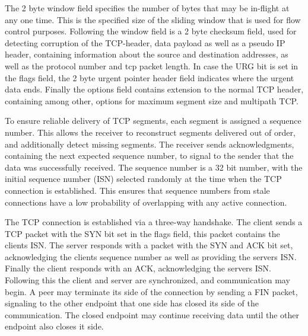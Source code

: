 \documentclass[english, 12pt, a4paper, elec, utf8, a-2b, online]{aaltothesis}
\begin{document}
The 2 byte window field specifies the number of bytes that may be in-flight at any one
time. This is the specified size of the sliding window that is used for flow
control purposes. Following the window field is a 2 byte checksum field, used for
detecting corruption of the TCP-header, data payload as well as a pseudo IP header,
containing information about the source and destination addresses, as well as the
protocol number and tcp packet length. In case the URG bit is set in the flags field,
the 2 byte urgent pointer header field indicates where the urgent data ends. Finally
the options field contains extension to the normal TCP header, containing among other, options
for maximum segment size and multipath TCP\cite{rfc8684}.

To ensure reliable delivery of TCP segments, each segment is assigned a sequence number.
This allows the receiver to reconstruct segments delivered out of order, and additionally
detect missing segments. The receiver sends acknowledgments, containing the next
expected sequence number, to signal to the sender that the data was successfully received.
The sequence number is a 32 bit number, with the initial sequence number (ISN)
selected randomly at the time when the TCP connection is established. This ensures that
sequence numbers from stale connections have a low probability of overlapping with
any active connection\cite{rfc793}.

The TCP connection is established via a three-way handshake. The client sends
a TCP packet with the SYN bit set in the flags field, this packet contains the
clients ISN. The server responds with a packet with the SYN and ACK bit set,
acknowledging the clients sequence number as well as providing the servers ISN.
Finally the client responds with an ACK, acknowledging the servers ISN. Following
this the client and server are synchronized, and communication may begin. A peer
may terminate its side of the connection by sending a FIN packet, signaling to
the other endpoint that one side has closed its side of the communication. The
closed endpoint may continue receiving data until the other endpoint also closes
it side\cite{rfc793}.
\end{document}
